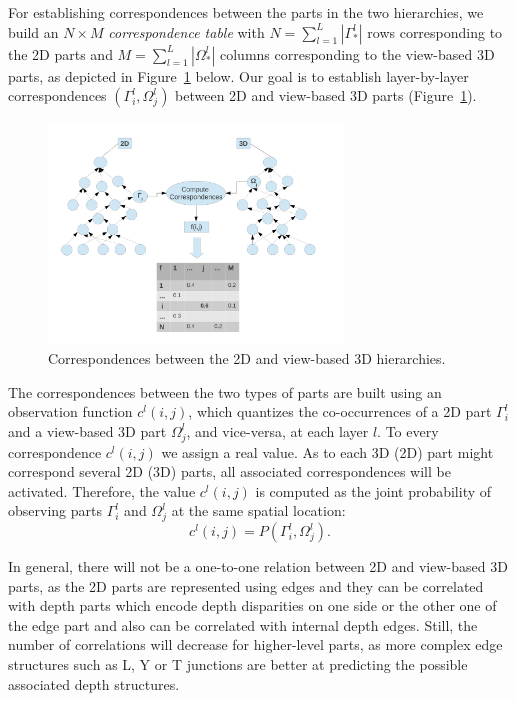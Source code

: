 \documentclass[runningheads]{llncs}
\begin{document}
For establishing correspondences between the parts in the two hierarchies, we build an $N\times M$ \emph{correspondence table} with $N=\sum_{l=1}^L |\Gamma_*^l|$ rows corresponding to the 2D parts and $M=\sum_{l=1}^L |\Omega_*^l|$ columns corresponding to the view-based 3D parts, as depicted in Figure~\ref{fig:fused-models} below.  Our goal is to establish layer-by-layer correspondences $(\Gamma_{i}^l,\Omega_{j}^l)$ between 2D and view-based 3D  parts (Figure~\ref{fig:fused-models}).

\begin{figure}
\begin{center}
\includegraphics[clip, trim=0.5cm 1cm 0.5cm 1cm, width=0.7\textwidth]{Fused_representation}
\end{center}
\caption{Correspondences between the 2D and view-based 3D hierarchies.}
\label{fig:fused-models}
\end{figure}

The correspondences between the two types of parts are built using an observation function $c^l(i,j)$, which quantizes the co-occurrences of a 2D part $\Gamma_i^l$ and a view-based 3D part $\Omega_j^l$, and vice-versa, at each layer $l$. 
To every correspondence $c^l(i,j)$ we assign a real value. As to each 3D (2D) part might correspond several 2D (3D) parts, all associated correspondences will be activated. Therefore, the value $c^l(i,j)$ is computed as the joint probability of observing parts $\Gamma_i^l$ and $\Omega_j^l$ at the same spatial location:
\begin{equation}
  c^l(i,j) = P(\Gamma_i^l,\Omega_j^l).
  \label{eqn:cij.Pij}
 \end{equation} 

In general, there will not be a one-to-one relation between 2D and view-based 3D parts, as the 2D parts are represented using edges and they can be correlated with depth parts which encode depth disparities on one side or the other one of the edge part and also can be correlated with internal depth edges. Still, the number of correlations will decrease for higher-level parts, as more complex edge structures such as L, Y or T junctions are better at predicting the possible associated depth structures.
\end{document}

